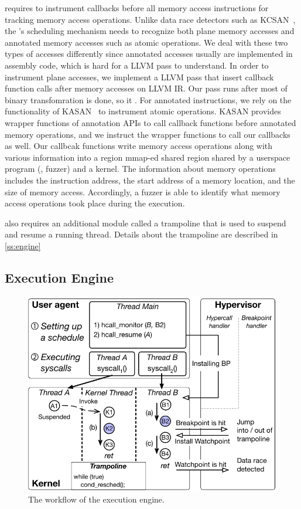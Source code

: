 \sys requires to instrument callbacks before all memory access
instructions for tracking memory access operations.
%
Unlike data race detectors such as KCSAN~\cite{kcsan}, the \sys's
scheduling mechanism needs to recognize both plane memory accesses and
annotated memory accesses such as atomic operations.
%
We deal with these two types of accesses differently since annotated
accesses usually are implemented in assembly code, which is hard for a
LLVM pass to understand.
%
In order to instrument plane accesses, we implement a LLVM pass that
insert callback function calls after memory accesses on LLVM IR.
%
Our pass runs after most of binary transfomration is done, so it
.
%
For annotated instructions, we rely on the functionality of
KASAN~\cite{kasan} to instrument atomic operations.
%
KASAN provides wrapper functions of annotation APIs to call callback
functions before annotated memory operations, and we instruct the
wrapper functions to call our callbacks as well.
%
Our callbcak functions write memory access operations along with
various information into a region mmap-ed shared region shared by a
userspace program (\ie, fuzzer) and a kernel. The information about
memory operations includes the instruction address, the start address
of a memory location, and the size of memory access.
%
Accordingly, a fuzzer is able to identify what memory access
operations took place during the execution.

\sys also requires an additional module called a trampoline that is
used to suspend and resume a running thread. Details about the
trampoline are described in \autoref{ss:engine}




\subsection{Execution Engine}
\label{ss:engine}

\begin{figure}
  \includegraphics[width=0.9\linewidth]{fig/workflow-hypervisor.pdf}
  \caption{The workflow of the execution engine. }
  \label{fig:workflow-hypervisor}
\end{figure}

